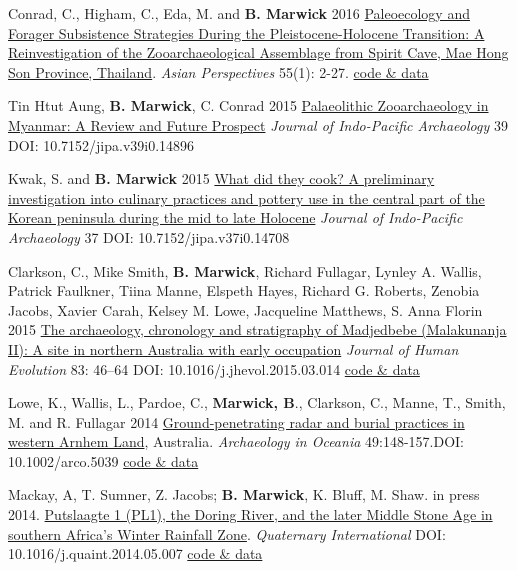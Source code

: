 \documentclass[11pt,article,oneside]{memoir}
\begin{document}
{{{{\ind Conrad, C., Higham, C., Eda, M. and \textbf{B. Marwick} 2016 \href{https://doi.org/10.1353/asi.2016.0013}{Paleoecology and Forager Subsistence Strategies During the Pleistocene-Holocene Transition: A Reinvestigation of the Zooarchaeological Assemblage from Spirit Cave, Mae Hong Son Province, Thailand}. \textit{Asian Perspectives} 55(1): 2-27. \href{http://hdl.handle.net/1928/26730}{code \& data}

\ind Tin Htut Aung, \textbf{B. Marwick}, C. Conrad 2015 \href{https://journals.lib.washington.edu/index.php/JIPA/article/view/14896}{Palaeolithic Zooarchaeology in Myanmar: A Review and Future Prospect} \textit{Journal of Indo-Pacific Archaeology} 39 DOI: 10.7152/jipa.v39i0.14896

\ind Kwak, S. and \textbf{B. Marwick} 2015 \href{http://journals.lib.washington.edu/index.php/JIPA/article/view/14708}{What did they cook? A preliminary investigation into culinary practices and pottery use in the central part of the Korean peninsula during the mid to late Holocene} \textit{Journal of Indo-Pacific Archaeology} 37  DOI: 10.7152/jipa.v37i0.14708

\ind Clarkson, C., Mike Smith, \textbf{B. Marwick}, Richard Fullagar, Lynley A. Wallis, Patrick Faulkner, Tiina Manne, Elspeth Hayes, Richard G. Roberts, Zenobia Jacobs, Xavier Carah, Kelsey M. Lowe, Jacqueline Matthews, S. Anna Florin 2015 \href{http://www.sciencedirect.com/science/article/pii/S0047248415000846}{The archaeology, chronology and stratigraphy of Madjedbebe (Malakunanja II): A site in northern Australia with early occupation} \textit{Journal of Human Evolution} 83: 46–64 DOI: 10.1016/j.jhevol.2015.03.014 \href{https://github.com/benmarwick/1989-excavation-report-Madjebebe}{code \& data}

\ind Lowe, K., Wallis, L., Pardoe, C., \textbf{Marwick, B}., Clarkson, C., Manne, T., Smith, M. and R. Fullagar 2014 \href{http://faculty.washington.edu/bmarwick/PDFs/Lowe_et_al_2014_MJB_GPR.pdf}{Ground-penetrating radar and burial practices in western Arnhem Land}, Australia. \textit{Archaeology in Oceania} 49:148-157.\newline  DOI: 10.1002/arco.5039 \href{https://github.com/benmarwick/Rocks-and-burials-at-Madjebebe}{code \& data}

\ind Mackay, A, T. Sumner, Z. Jacobs; \textbf{B. Marwick}, K. Bluff, M. Shaw. in press 2014.  \href{http://faculty.washington.edu/bmarwick/PDFs/Mackay_et_al_2014.pdf}{Putslaagte 1 (PL1), the Doring River, and the later Middle Stone Age in southern Africa's Winter Rainfall Zone}. \textit{Quaternary International} \newline DOI: 10.1016/j.quaint.2014.05.007 \href{https://github.com/benmarwick/Particle-size-analysis-Putslaagte-1}{code \& data}

}}}}
\end{document}
